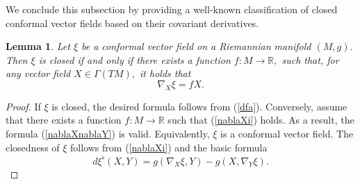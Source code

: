 \documentclass[10pt,leqno,oneside]{amsart}
\newtheorem{Lem}{Lemma}
\begin{document}
{         We conclude this subsection by providing a well-known classification of closed conformal vector fields based on their covariant derivatives.
         \begin{Lem}\label{CCVF}
                Let $\xi$ be a conformal vector field on a Riemannian manifold $(M, g).$ Then $\xi$ is closed if and only if there exists a function $f:M\rightarrow\mathbb{R},$ such that, for any vector field $X\in\Gamma(TM),$ it holds that
                \begin{equation}\label{nablaXi}\nabla_X\xi=fX.\end{equation}
         \end{Lem}
         \begin{proof}
               If $\xi$ is closed, the desired formula follows from (\ref{dfa}). Conversely, assume that there exists a function $f:M\rightarrow\mathbb{R}$ such that (\ref{nablaXi}) holds. As a result, the formula (\ref{nablaXnablaY}) is valid. Equivalently, $\xi$ is a conformal vector field. The closedness of $\xi$ follows from (\ref{nablaXi}) and the basic formula
                $$d\xi^{\flat}(X,Y)=g(\nabla_X\xi,Y)-g(X,\nabla_Y\xi).$$
         \end{proof}

}
\end{document}
